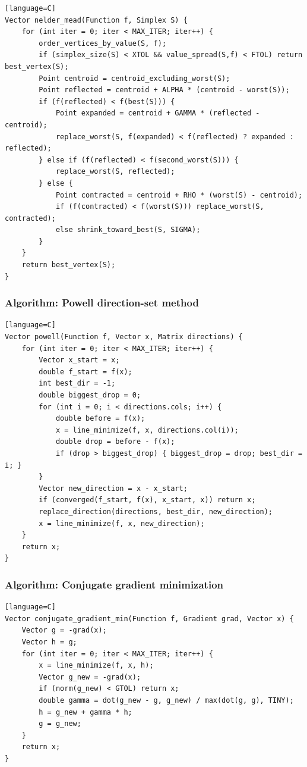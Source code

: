 \documentclass[11pt]{article}
\begin{document}
\begin{verbatim}[language=C]
Vector nelder_mead(Function f, Simplex S) {
    for (int iter = 0; iter < MAX_ITER; iter++) {
        order_vertices_by_value(S, f);
        if (simplex_size(S) < XTOL && value_spread(S,f) < FTOL) return best_vertex(S);
        Point centroid = centroid_excluding_worst(S);
        Point reflected = centroid + ALPHA * (centroid - worst(S));
        if (f(reflected) < f(best(S))) {
            Point expanded = centroid + GAMMA * (reflected - centroid);
            replace_worst(S, f(expanded) < f(reflected) ? expanded : reflected);
        } else if (f(reflected) < f(second_worst(S))) {
            replace_worst(S, reflected);
        } else {
            Point contracted = centroid + RHO * (worst(S) - centroid);
            if (f(contracted) < f(worst(S))) replace_worst(S, contracted);
            else shrink_toward_best(S, SIGMA);
        }
    }
    return best_vertex(S);
}
\end{verbatim}

\subsubsection{Algorithm: Powell direction-set method}\label{algorithm-powell-direction-set-method}

\begin{verbatim}[language=C]
Vector powell(Function f, Vector x, Matrix directions) {
    for (int iter = 0; iter < MAX_ITER; iter++) {
        Vector x_start = x;
        double f_start = f(x);
        int best_dir = -1;
        double biggest_drop = 0;
        for (int i = 0; i < directions.cols; i++) {
            double before = f(x);
            x = line_minimize(f, x, directions.col(i));
            double drop = before - f(x);
            if (drop > biggest_drop) { biggest_drop = drop; best_dir = i; }
        }
        Vector new_direction = x - x_start;
        if (converged(f_start, f(x), x_start, x)) return x;
        replace_direction(directions, best_dir, new_direction);
        x = line_minimize(f, x, new_direction);
    }
    return x;
}
\end{verbatim}

\subsubsection{Algorithm: Conjugate gradient minimization}\label{algorithm-conjugate-gradient-minimization}

\begin{verbatim}[language=C]
Vector conjugate_gradient_min(Function f, Gradient grad, Vector x) {
    Vector g = -grad(x);
    Vector h = g;
    for (int iter = 0; iter < MAX_ITER; iter++) {
        x = line_minimize(f, x, h);
        Vector g_new = -grad(x);
        if (norm(g_new) < GTOL) return x;
        double gamma = dot(g_new - g, g_new) / max(dot(g, g), TINY);
        h = g_new + gamma * h;
        g = g_new;
    }
    return x;
}
\end{verbatim}
\end{document}
